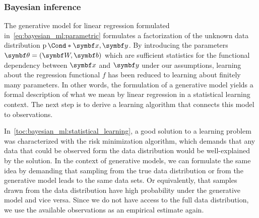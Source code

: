 \subsubsection{Bayesian inference}
The generative model for linear regression formulated in~\cref{eq:bayesian_ml:parametric} formulates a factorization of the unknown data distribution $\Prob*{\mat{x}, \mat{y}}$.
By introducing the parameters $\mat{\theta} = (\mat{W}, \mat{b})$ which are sufficient statistics for the functional dependency between $\mat{x}$ and $\mat{y}$ under our assumptions, learning about the regression functional $f$ has been reduced to learning about finitely many parameters.
In other words, the formulation of a generative model yields a formal description of what we mean by linear regression in a statistical learning context.
The next step is to derive a learning algorithm that connects this model to observations.

In~\cref{toc:bayesian_ml:statistical_learning}, a good solution to a learning problem was characterized with the risk minimization algorithm, which demands that any data that could be observed form the data distribution would be well-explained by the solution.
In the context of generative models, we can formulate the same idea by demanding that sampling from the true data distribution or from the generative model leads to the same data sets.
Or equivalently, that samples drawn from the data distribution have high probability under the generative model and vice versa.
Since we do not have access to the full data distribution, we use the available observations as an empirical estimate again.

